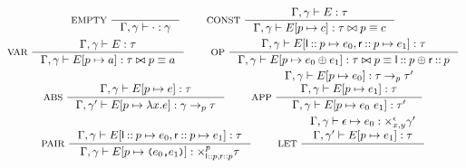 \begin{figure}
  \centering
  \begin{gather*}
    \inference[ EMPTY ]{ }{
      \Gamma, \gamma \judges \cdot : \gamma } \qquad
    \inference[ CONST ]{ %
      \Gamma, \gamma \judges E : \tau }{ %
      \Gamma, \gamma \judges \upd{ E }{ p }{ c } : %
      \tau \joinctr p \equiv c } \\
    \inference[ VAR ]{ %
      \Gamma, \gamma \judges E : \tau }{ %
      \Gamma, \gamma \judges \upd{ E }{ p }{ a } : %
      \tau \joinctr p \equiv a } \qquad
    \inference[ OP ]{ %
      \Gamma, \gamma \judges %
      E[ \leftchild \cons p \mapsto e_0, %
        \rightchild \cons p \mapsto e_1 ] : \tau }{ %
      \Gamma, \gamma \judges \upd{ E }{ p }{ e_0 \oplus e_1 } : %
      \tau \joinctr %
      p \equiv \leftchild \cons p \oplus \rightchild \cons p } \\
    \inference[ ABS ]{ 
      \Gamma, \gamma \judges \upd{ E }{ p }{ e } : \tau }{ %
      \Gamma, \gamma' \judges \upd{ E }{ p }{ \lambda x. e } : %
      \gamma \to_p \tau } \qquad
    \inference[ APP ]{ %
      \Gamma, \gamma \judges \upd{E}{p}{e_0} : \tau \to_p \tau' \\
      \Gamma, \gamma \judges \upd{E}{p}{e_1} : \tau }{
      \Gamma, \gamma \judges \upd{ E }{ p }{e_0\ e_1} : \tau' } \\
    \inference[ PAIR ]{
      \Gamma, \gamma \judges %
      E[ \leftchild \cons p \mapsto e_0, %
      \rightchild \cons p \mapsto e_1 ] : \tau }{
      \Gamma, \gamma \judges \upd{E}{p}{ \pair{e_0}{e_1} } :
      \times_{\leftchild \cons p, \rightchild \cons p}^p \tau } \qquad
    \inference[ LET ]{
      \Gamma, \gamma \judges \epsilon \mapsto e_0 : %
      \times_{x, y}^{\epsilon} \gamma' \\
      \Gamma, \gamma' \judges \upd{ E }{ p }{ e_1 } : \tau }{
}
\end{gather*}
\end{figure}
